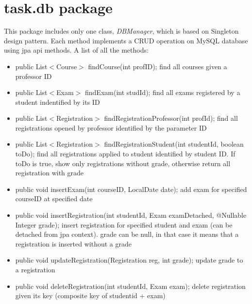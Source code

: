 \documentclass{report}
\begin{document}
\section*{task.db package}
This package includes only one class, \textit{DBManager}, which is based on Singleton design pattern. Each method implements a CRUD operation on MySQL database using jpa api methods. A list of all the methods:
\begin{itemize}
	\item public List\(<\)Course\(>\) findCourse(int profID); \newline find all courses given a professor ID
	\item public List\(<\)Exam\(>\) findExam(int studId); \newline find all exams registered by a student indentified by its ID 
	\item public List\(<\)Registration\(>\) findRegistrationProfessor(int profId); \newline find all registrations opened by professor identified by the parameter ID
	\item public List\(<\)Registration\(>\) findRegistrationStudent(int studentId, boolean toDo); \newline find all registrations applied to student identified by student ID. If toDo is true, show only registrations without grade, otherwise return all registration with grade
	\item public void insertExam(int courseID, LocalDate date); \newline add exam for specified courseID at specified date
	\item public void insertRegistration(int studentId, Exam examDetached, @Nullable Integer grade); \newline insert registration for specified student and exam (can be detached from jpa context). grade can be null, in that case it means that a registration is inserted without a grade
	\item public void updateRegistration(Registration reg, int grade); \newline update grade to a registration
	\item public void deleteRegistration(int studentId, Exam exam); \newline delete registration given its key (composite key of studentid + exam)
\end{itemize}
\end{document}
